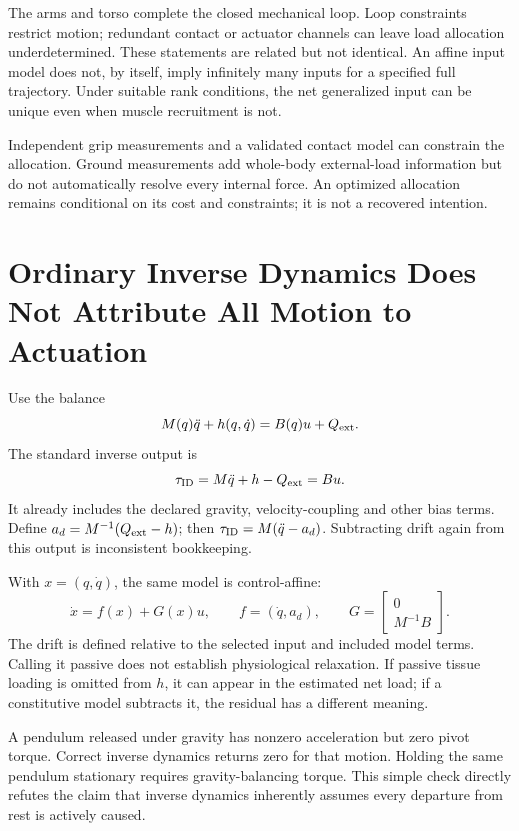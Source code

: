 \documentclass[11pt,a4paper]{article}
\begin{document}
The arms and torso complete the closed mechanical loop. Loop constraints restrict motion; redundant contact or actuator channels can leave load allocation underdetermined. These statements are related but not identical. An affine input model does not, by itself, imply infinitely many inputs for a specified full trajectory. Under suitable rank conditions, the net generalized input can be unique even when muscle recruitment is not.

Independent grip measurements and a validated contact model can constrain the allocation. Ground measurements add whole-body external-load information but do not automatically resolve every internal force. An optimized allocation remains conditional on its cost and constraints; it is not a recovered intention.

\section{Ordinary Inverse Dynamics Does Not Attribute All Motion to Actuation}
Use the balance
\begin{equation}
M(q)\ddot q+h(q,\dot q)=B(q)u+Q_{\rm ext}.
\end{equation}
The standard inverse output is
\begin{equation}
\tau_{\rm ID}=M\ddot q+h-Q_{\rm ext}=Bu.
\end{equation}
It already includes the declared gravity, velocity-coupling and other bias terms. Define $a_d=M^{-1}(Q_{\rm ext}-h)$; then
$\tau_{\rm ID}=M(\ddot q-a_d)$. Subtracting drift again from this output is inconsistent bookkeeping.

With $x=(q,\dot q)$, the same model is control-affine:
\begin{equation}
\dot x=f(x)+G(x)u,
\qquad f=(\dot q,a_d),\qquad G=\begin{bmatrix}0\\M^{-1}B\end{bmatrix}.
\end{equation}
The drift is defined relative to the selected input and included model terms. Calling it passive does not establish physiological relaxation. If passive tissue loading is omitted from $h$, it can appear in the estimated net load; if a constitutive model subtracts it, the residual has a different meaning.

A pendulum released under gravity has nonzero acceleration but zero pivot torque. Correct inverse dynamics returns zero for that motion. Holding the same pendulum stationary requires gravity-balancing torque. This simple check directly refutes the claim that inverse dynamics inherently assumes every departure from rest is actively caused.
\end{document}

